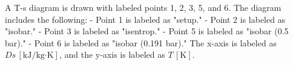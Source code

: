 A T-s diagram is drawn with labeled points 1, 2, 3, 5, and 6. The diagram includes the following:  
- Point 1 is labeled as "setup."  
- Point 2 is labeled as "isobar."  
- Point 3 is labeled as "isentrop."  
- Point 5 is labeled as "isobar (0.5 bar)."  
- Point 6 is labeled as "isobar (0.191 bar)."  
The x-axis is labeled as \( Ds \, [\text{kJ/kg·K}] \), and the y-axis is labeled as \( T \, [\text{K}] \).